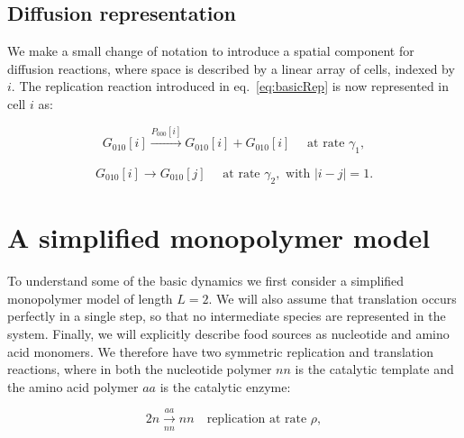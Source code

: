 \documentclass{article}
\begin{document}

\subsection{Diffusion representation}

We make a small change of notation to introduce a spatial component for diffusion reactions, where space is described by a linear array of cells, indexed by $i$. The replication reaction introduced in eq.~\ref{eq:basicRep} is now represented in cell $i$ as:

\begin{equation}
G_{010}[i] \xrightarrow[]{P_{000}[i]}G_{010}[i] + G_{010}[i]\quad \text{ at rate } \gamma_1,
\end{equation}


\begin{equation}
G_{010}[i] \xrightarrow[]{}G_{010}[j] \quad \text{ at rate } \gamma_2, \text{ with }|i-j|=1.
\end{equation}

\section{A simplified monopolymer model}

To understand some of the basic dynamics we first consider a simplified monopolymer model of length $L=2$. We will also assume that translation occurs perfectly in a single step, so that no intermediate species are represented in the system. 
Finally, we will explicitly describe food sources as nucleotide and amino acid monomers. We therefore have two symmetric replication and translation reactions, where in both the nucleotide polymer $nn$ is the catalytic template and the amino acid polymer $aa$ is the catalytic enzyme:

\begin{equation}
2n \xrightarrow[nn]{aa} nn\quad \text{replication at rate } \rho,
\label{eq:simplifiedRep}
\end{equation}
\end{document}
